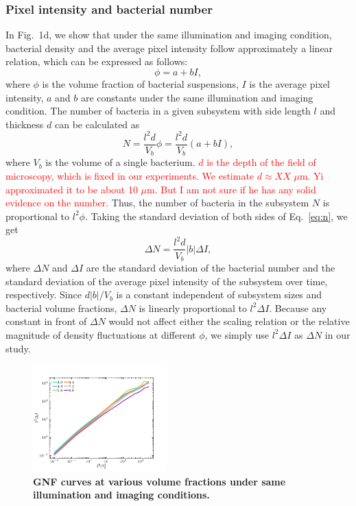 \documentclass[twocolumn,aps,prx,amsmath,amssymb,longbibliography]{revtex4-2}
\begin{document}
\subsubsection{Pixel intensity and bacterial number}
In Fig.~1d, we show that under the same illumination and imaging condition, bacterial density and the average pixel intensity follow approximately a linear relation, which can be expressed as follows:
\begin{equation}
  \label{eq:phi-I-relation}
  \phi = a + bI,
\end{equation}
where $\phi$ is the volume fraction of bacterial suspensions, $I$ is the average pixel intensity, $a$ and $b$ are constants under the same illumination and imaging condition. The number of bacteria in a given subsystem with side length $l$ and thickness $d$ can be calculated as
\begin{equation}
  \label{eq:n}
  N = \frac{l^2d}{V_b} \phi = \frac{l^2d}{V_b} (a+bI),
\end{equation}
where $V_b$ is the volume of a single bacterium. \textcolor{red}{$d$ is the depth of the field of microscopy, which is fixed in our experiments. We estimate $d \approx XX$ $\mu$m. Yi approximated it to be about 10 $\mu$m. But I am not sure if he has any solid evidence on the number.} Thus, the number of bacteria in the subsystem $N$ is proportional to $l^2 \phi$. Taking the standard deviation of both sides of Eq.~\ref{eq:n}, we get
\begin{equation}
  \label{intensity-number}
  \Delta N = \frac{l^2 d}{V_b}|b|\Delta I,
\end{equation}
where $\Delta N$ and $\Delta I$ are the standard deviation of the bacterial number and the standard deviation of the average pixel intensity of the subsystem over time, respectively. Since $d|b|/V_b$ is a constant independent of subsystem sizes and bacterial volume fractions, $\Delta N$ is linearly proportional to $l^2\Delta I$. Because any constant in front of $\Delta N$ would not affect either the scaling relation or the relative magnitude of density fluctuations at different $\phi$, we simply use $l^2\Delta I$ as $\Delta N$ in our study.


\begin{figure}[t]
	\begin{center}
		\includegraphics[width=0.46\textwidth]{Figures/GNF-normalization/same-illumination.pdf}
		\caption[Density autocorrelation]
		{
			\textbf{GNF curves at various volume fractions under same illumination and imaging conditions.}
		}
		\label{fig:same-conditions}
	\end{center}
\end{figure}
\end{document}
